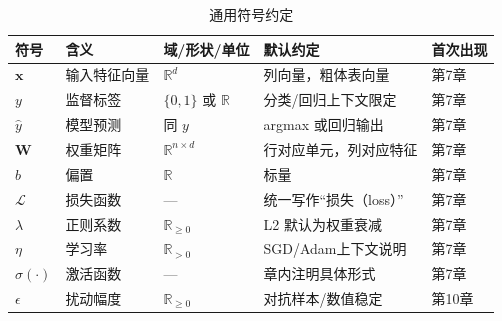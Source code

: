 
\begin{table}[htbp]
\centering
\caption{通用符号约定}
\begin{tabular}{@{}p{2.2cm}p{7.2cm}p{3.0cm}p{3.0cm}p{2.2cm}@{}}
\toprule
符号 & 含义 & 域/形状/单位 & 默认约定 & 首次出现 \\
\midrule
$\mathbf{x}$ & 输入特征向量 & $\mathbb{R}^{d}$ & 列向量，粗体表向量 & 第7章 \\
$y$ & 监督标签 & $\{0,1\}$ 或 $\mathbb{R}$ & 分类/回归上下文限定 & 第7章 \\
$\hat{y}$ & 模型预测 & 同 $y$ & argmax 或回归输出 & 第7章 \\
$\mathbf{W}$ & 权重矩阵 & $\mathbb{R}^{n\times d}$ & 行对应单元，列对应特征 & 第7章 \\
$b$ & 偏置 & $\mathbb{R}$ & 标量 & 第7章 \\
$\mathcal{L}$ & 损失函数 & — & 统一写作“损失（loss）” & 第7章 \\
$\lambda$ & 正则系数 & $\mathbb{R}_{\ge 0}$ & L2 默认为权重衰减 & 第7章 \\
$\eta$ & 学习率 & $\mathbb{R}_{>0}$ & SGD/Adam上下文说明 & 第7章 \\
$\sigma(\cdot)$ & 激活函数 & — & 章内注明具体形式 & 第7章 \\
$\epsilon$ & 扰动幅度 & $\mathbb{R}_{\ge 0}$ & 对抗样本/数值稳定 & 第10章 \\
\bottomrule
\end{tabular}
\end{table}